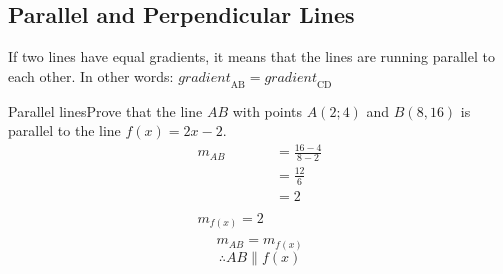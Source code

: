   \subsection*{Parallel and Perpendicular Lines}    
% 
\label{m39108*eip-332}If two lines have equal gradients, it means that the lines are running parallel to each other. In other words: ${gradient}_{\mathrm{AB}}={gradient}_{\mathrm{CD}}$

\begin{wex}{Parallel lines}{Prove that the line $AB$ with points $A(2;4)$ and $B(8,16)$ is parallel to the line $f(x) = 2x-2$.}{
\begin{equation*}
 \begin{array}{cl}
  m_{AB} &= \frac{16 - 4}{8 - 2}\\
  &= \frac{12}{6}\\
  &= 2 \\
\\
 m_{f(x)} = 2\\
 \end{array}
\end{equation*}
\begin{equation*}
 m_{AB} = m_{f(x)}
\end{equation*}
\begin{equation*}
 \therefore AB \parallel f(x)
\end{equation*}
}
\end{wex}


